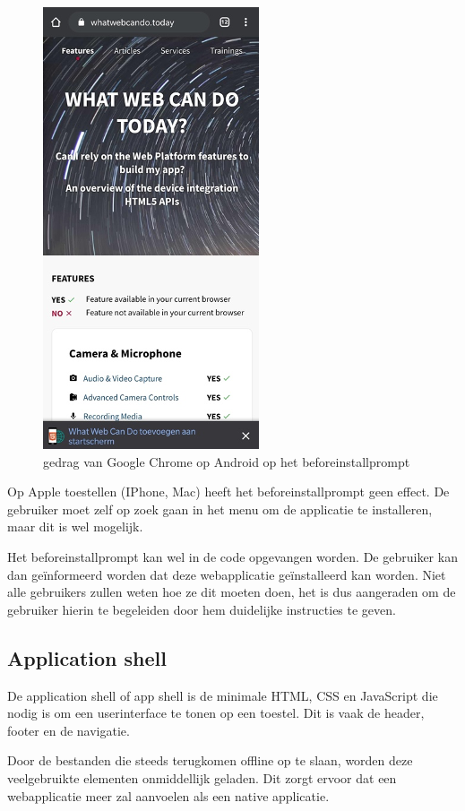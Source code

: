 	\begin{figure}[H]
		\centering
		\includegraphics{./img/beforeinstallprompt_android.png}
		\caption{gedrag van Google Chrome op Android op het beforeinstallprompt}
	\end{figure}
	
	Op Apple toestellen (IPhone, Mac) heeft het beforeinstallprompt geen effect. De gebruiker moet zelf op zoek gaan in het menu om de applicatie te installeren, maar dit is wel mogelijk.
	
	Het beforeinstallprompt kan wel in de code opgevangen worden. De  gebruiker kan dan geïnformeerd worden dat deze webapplicatie geïnstalleerd kan worden. 
	Niet alle gebruikers zullen weten hoe ze dit moeten doen, het is dus aangeraden om de gebruiker hierin te begeleiden door hem duidelijke instructies te geven.
	\autocite{PWAbuilder2020}


\subsection{Application shell}
	De application shell of app shell is de minimale HTML, CSS en JavaScript die nodig is om een userinterface te tonen op een toestel. Dit is vaak de header, footer en de navigatie.
	
	Door de bestanden die steeds terugkomen offline op te slaan, worden deze veelgebruikte elementen onmiddellijk geladen. Dit zorgt ervoor dat een webapplicatie meer zal aanvoelen als een native applicatie.
	
